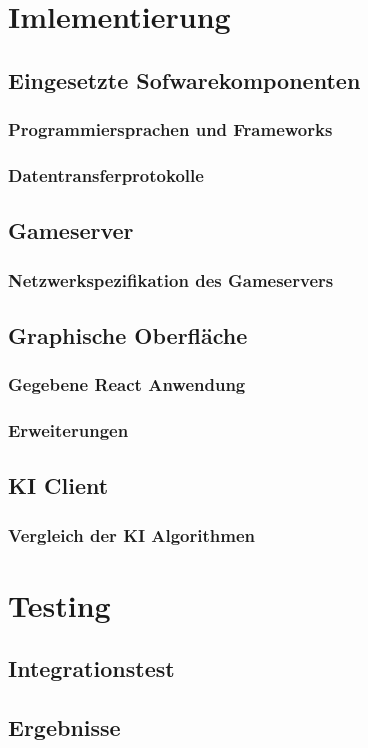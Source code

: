 \documentclass[12pt,a4paper,bibliography=totocnumbered,listof=totocnumbered]{article}
\begin{document}
\section{Imlementierung}
\subsection{Eingesetzte Sofwarekomponenten}
\subsubsection{Programmiersprachen und Frameworks}
\subsubsection{Datentransferprotokolle}
\subsection{Gameserver}
\subsubsection{Netzwerkspezifikation des Gameservers}
\subsection{Graphische Oberfläche}
\subsubsection{Gegebene React Anwendung}
\subsubsection{Erweiterungen}
\subsection{KI Client}
\subsubsection{Vergleich der KI Algorithmen}

\section{Testing}
\subsection{Integrationstest}
\subsection{Ergebnisse}
\end{document}
